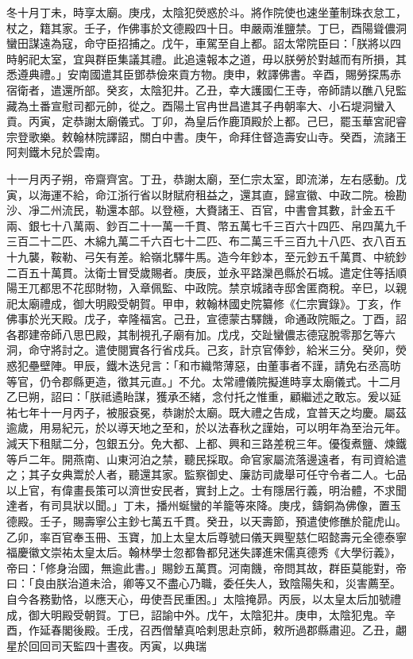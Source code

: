 \begin{pinyinscope}
 冬十月丁未，時享太廟。庚戌，太陰犯熒惑於斗。將作院使也速坐董制珠衣怠工，杖之，籍其家。壬子，作佛事於文德殿四十日。申嚴兩淮鹽禁。丁巳，酉陽聳儂洞蠻田謀遠為寇，命守臣招捕之。戊午，車駕至自上都。詔太常院臣曰：「朕將以四時躬祀太室，宜與群臣集議其禮。此追遠報本之道，毋以朕勞於對越而有所損，其悉遵典禮。」安南國遣其臣鄧恭儉來貢方物。庚申，敕譯佛書。辛酉，賜勞探馬赤宿衛者，遣還所部。癸亥，太陰犯井。乙丑，幸大護國仁王寺，帝師請以醮八兒監藏為土番宣慰司都元帥，從之。酉陽土官冉世昌遣其子冉朝率大、小石堤洞蠻入貢。丙寅，定恭謝太廟儀式。丁卯，為皇后作鹿頂殿於上都。己巳，罷玉華宮祀睿宗登歌樂。敕翰林院譯詔，關白中書。庚午，命拜住督造壽安山寺。癸酉，流諸王阿刾鐵木兒於雲南。



 十一月丙子朔，帝齋齊宮。丁丑，恭謝太廟，至仁宗太室，即流涕，左右感動。戊寅，以海運不給，命江浙行省以財賦府租益之，還其直，歸宣徽、中政二院。檢勘沙、凈二州流民，勒還本部。以登極，大賚諸王、百官，中書會其數，計金五千兩、銀七十八萬兩、鈔百二十一萬一千貫、幣五萬七千三百六十四匹、帛四萬九千三百二十二匹、木綿九萬二千六百七十二匹、布二萬三千三百九十八匹、衣八百五十九襲，鞍勒、弓矢有差。給嶺北驛牛馬。造今年鈔本，至元鈔五千萬貫、中統鈔二百五十萬貫。汰衛士冒受歲賜者。庚辰，並永平路灤邑縣於石城。遣定住等括順陽王兀都思不花邸財物，入章佩監、中政院。禁京城諸寺邸舍匿商稅。辛巳，以親祀太廟禮成，御大明殿受朝賀。甲申，敕翰林國史院纂修《仁宗實錄》。丁亥，作佛事於光天殿。戊子，幸隆福宮。己丑，宣德蒙古驛饑，命通政院賑之。丁酉，詔各郡建帝師八思巴殿，其制視孔子廟有加。戊戌，交趾蠻儂志德寇脫零那乞等六洞，命守將討之。遣使閱實各行省戍兵。己亥，計京官俸鈔，給米三分。癸卯，熒惑犯壘壁陣。甲辰，鐵木迭兒言：「和市織幣薄惡，由董事者不謹，請免右丞高昉等官，仍令郡縣更造，徵其元直。」不允。太常禮儀院擬進時享太廟儀式。十二月乙巳朔，詔曰：「朕祗遹眙謀，獲承丕緒，念付托之惟重，顧繼述之敢忘。爰以延祐七年十一月丙子，被服袞冕，恭謝於太廟。既大禮之告成，宜普天之均慶。屬茲逾歲，用易紀元，於以導天地之至和，於以法春秋之謹始，可以明年為至治元年。減天下租賦二分，包銀五分。免大都、上都、興和三路差稅三年。優復煮鹽、煉鐵等戶二年。開燕南、山東河泊之禁，聽民採取。命官家屬流落邊遠者，有司資給遣之；其子女典鬻於人者，聽還其家。監察御史、廉訪司歲舉可任守令者二人。七品以上官，有偉畫長策可以濟世安民者，實封上之。士有隱居行義，明治體，不求聞達者，有司具狀以聞。」丁未，播州蜒蠻的羊籠等來降。庚戌，鑄銅為佛像，置玉德殿。壬子，賜壽寧公主鈔七萬五千貫。癸丑，以天壽節，預遣使修醮於龍虎山。乙卯，率百官奉玉冊、玉寶，加上太皇太后尊號曰儀天興聖慈仁昭懿壽元全德泰寧福慶徽文崇祐太皇太后。翰林學士忽都魯都兒迷失譯進宋儒真德秀《大學衍義》，帝曰：「修身治國，無逾此書。」賜鈔五萬貫。河南饑，帝問其故，群臣莫能對，帝曰：「良由朕治道未洽，卿等又不盡心乃職，委任失人，致陰陽失和，災害薦至。自今各務勤恪，以應天心，毋使吾民重困。」太陰掩昴。丙辰，以太皇太后加號禮成，御大明殿受朝賀。丁巳，詔諭中外。戊午，太陰犯井。庚申，太陰犯鬼。辛酉，作延春閣後殿。壬戌，召西僧輦真哈剌思赴京師，敕所過郡縣肅迎。乙丑，翽星於回回司天監四十晝夜。丙寅，以典瑞
\end{pinyinscope}
